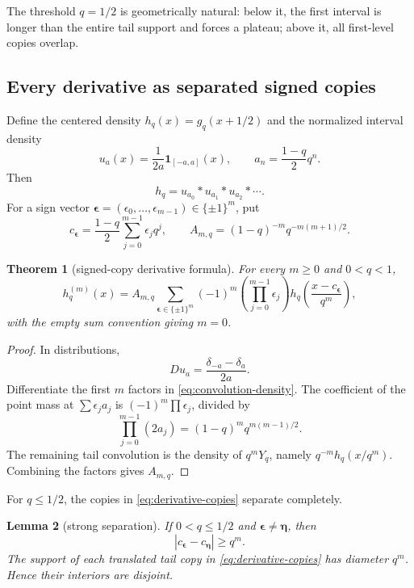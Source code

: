 \documentclass[11pt]{article}
\newtheorem{theorem}{Theorem}[section]
\newtheorem{lemma}[theorem]{Lemma}
\theoremstyle{definition}
\theoremstyle{remark}
\begin{document}
The threshold $q=1/2$ is geometrically natural: below it, the first interval is longer than the entire tail support and forces a plateau; above it, all first-level copies overlap.

\subsection{Every derivative as separated signed copies}

Define the centered density $h_q(x)=g_q(x+1/2)$ and the normalized interval density
\[
 u_a(x)=\frac{1}{2a}\mathbf 1_{[-a,a]}(x),
 \qquad a_n=\frac{1-q}{2}q^n.
\]
Then
\begin{equation}\label{eq:convolution-density}
 h_q=u_{a_0}*u_{a_1}*u_{a_2}*\cdots.
\end{equation}
For a sign vector $\bm\epsilon=(\epsilon_0,\ldots,\epsilon_{m-1})\in\{\pm1\}^m$, put
\begin{equation}\label{eq:centers}
 c_{\bm\epsilon}=\frac{1-q}{2}\sum_{j=0}^{m-1}\epsilon_jq^j,
 \qquad
 A_{m,q}=(1-q)^{-m}q^{-m(m+1)/2}.
\end{equation}

\begin{theorem}[signed-copy derivative formula]\label{thm:derivative-copies}
For every $m\ge0$ and $0<q<1$,
\begin{equation}\label{eq:derivative-copies}
 h_q^{(m)}(x)=A_{m,q}
 \sum_{\bm\epsilon\in\{\pm1\}^m}
 (-1)^m\left(\prod_{j=0}^{m-1}\epsilon_j\right)
 h_q\!\left(\frac{x-c_{\bm\epsilon}}{q^m}\right),
\end{equation}
with the empty sum convention giving $m=0$.
\end{theorem}

\begin{proof}
In distributions,
\[
 D u_a=\frac{\delta_{-a}-\delta_a}{2a}.
\]
Differentiate the first $m$ factors in \cref{eq:convolution-density}.  The coefficient of the point mass at $\sum\epsilon_ja_j$ is $(-1)^m\prod\epsilon_j$, divided by
\[
 \prod_{j=0}^{m-1}(2a_j)=(1-q)^mq^{m(m-1)/2}.
\]
The remaining tail convolution is the density of $q^mY_q$, namely $q^{-m}h_q(x/q^m)$.  Combining the factors gives $A_{m,q}$.
\end{proof}

For $q\le1/2$, the copies in \cref{eq:derivative-copies} separate completely.

\begin{lemma}[strong separation]\label{lem:center-separation}
If $0<q\le1/2$ and $\bm\epsilon\ne\bm\eta$, then
\[
 |c_{\bm\epsilon}-c_{\bm\eta}|\ge q^m.
\]
The support of each translated tail copy in \cref{eq:derivative-copies} has diameter $q^m$.  Hence their interiors are disjoint.
\end{lemma}
\end{document}
